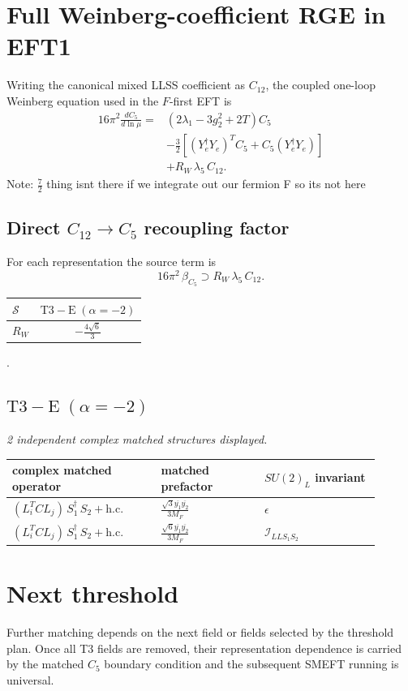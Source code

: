 \documentclass[9pt]{article}
\begin{document}
\section*{Full Weinberg-coefficient RGE in EFT1}
Writing the canonical mixed LLSS coefficient as $C_{12}$, the coupled one-loop Weinberg equation used in the $F$-first EFT is
\begin{align}
16\pi^2\frac{dC_5}{d\ln\mu}={}&(2\lambda_1-3g_2^2+2T)C_5\\
&-\frac32\left[(Y_e^\dagger Y_e)^T C_5+C_5(Y_e^\dagger Y_e)\right]\\
&+R_W\,\lambda_5\,C_{12}.
\end{align}
Note: $\frac{7}{2}$ thing isnt there if we integrate out our fermion F so its not here \subsection*{Direct $C_{12}\to C_5$ recoupling factor}
For each representation the source term is
\[16\pi^2\,\beta_{C_5}\supset R_W\,\lambda_5\,C_{12}.\]
\begin{longtable}{@{}lc@{}}
\toprule
$\mathcal{S}$ & $ \mathrm{T3-E}\;(\alpha=-2) $ \\
\midrule
$R_W$ & $ - \frac{4 \sqrt{6}}{3} $ \\
\bottomrule
\end{longtable}
.
\subsection*{$ \mathrm{T3-E}\;(\alpha=-2) $}
\textit{2 independent complex matched structures displayed. }
\begin{longtable}{@{}p{0.36\linewidth}p{0.25\linewidth}p{0.29\linewidth}@{}}
\toprule
complex matched operator & matched prefactor & $SU(2)_L$ invariant \\
\midrule
$ (L_i^T C L_j)\,S_1^\dagger\,S_2+\mathrm{h.c.} $ & $ \frac{\sqrt{3} \overline{y_{1}} \overline{y_{2}}}{3 M_F} $ & $ \epsilon $ \\
$ (L_i^T C L_j)\,S_1^\dagger\,S_2+\mathrm{h.c.} $ & $ \frac{\sqrt{6} \overline{y_{1}} \overline{y_{2}}}{3 M_F} $ & $ \mathcal{I}_{LLS_1S_2} $ \\
\bottomrule
\end{longtable}
\section*{Next threshold}
Further matching depends on the next field or fields selected by the threshold plan.  Once all T3 fields are removed, their representation dependence is carried by the matched $C_5$ boundary condition and the subsequent SMEFT running is universal.
\end{document}
